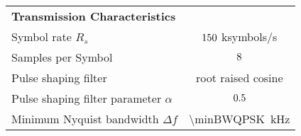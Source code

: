 \begin{table}[htbp]
\begin{tabular}{lc}
    \rowcolor[rgb]{ 0,  0,  0} \textcolor[rgb]{ 1,  1,  1}{\textbf{Transmission Characteristics}} & \textcolor[rgb]{ 1,  1,  1}{} 		\\
    	Symbol rate $R_s$ 						& $150$ ksymbols/s 				\\
    	Samples per Symbol 					& $8$													\\
	Pulse shaping filter 						& root raised cosine 											\\
    	Pulse shaping filter parameter $\alpha$ 		& $0.5$											\\
    	Minimum Nyquist bandwidth $\Delta f$ 		& \SI{\minBWQPSK}{kHz} 							\\
    \end{tabular}
  \label{tab:specs_data}
\end{table}


